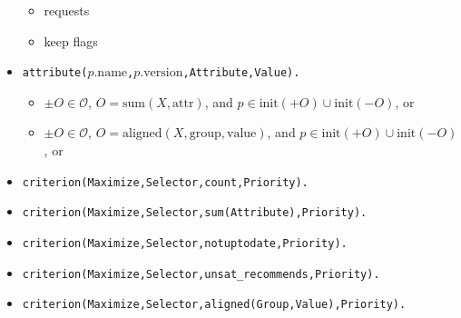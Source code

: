 \documentclass[a4paper,english]{article}
\begin{document}
\begin{itemize}
\begin{itemize}
      \item requests
      \item keep flags
    \end{itemize}
  \item \texttt{attribute($p.\mathrm{name}$,$p.\mathrm{version}$,Attribute,Value).}
    \begin{itemize}
      \item $\pm O\in\mathcal{O}$, $O=\mathrm{sum}(X,\mathrm{attr})$, and $p\in\mathrm{init}({+}O)\cup\mathrm{init}({-}O)$, or
      \item $\pm O\in\mathcal{O}$, $O=\mathrm{aligned}(X,\mathrm{group},\mathrm{value})$, and $p\in\mathrm{init}({+}O)\cup\mathrm{init}({-}O)$, or
    \end{itemize}
  \item \texttt{criterion(Maximize,Selector,count,Priority).}
  \item \texttt{criterion(Maximize,Selector,sum(Attribute),Priority).}
  \item \texttt{criterion(Maximize,Selector,notuptodate,Priority).}
  \item \texttt{criterion(Maximize,Selector,unsat\_recommends,Priority).}
  \item \texttt{criterion(Maximize,Selector,aligned(Group,Value),Priority).}
\end{itemize}
\end{document}
